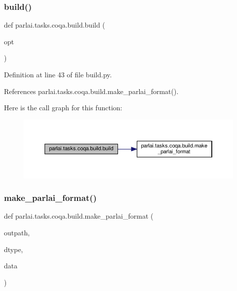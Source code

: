 \subsubsection{\texorpdfstring{build()}{build()}}
{\footnotesize\ttfamily def parlai.\+tasks.\+coqa.\+build.\+build (\begin{DoxyParamCaption}\item[{}]{opt }\end{DoxyParamCaption})}



Definition at line 43 of file build.\+py.



References parlai.\+tasks.\+coqa.\+build.\+make\+\_\+parlai\+\_\+format().

Here is the call graph for this function\+:
\nopagebreak
\begin{figure}[H]
\begin{center}
\leavevmode
\includegraphics[width=350pt]{namespaceparlai_1_1tasks_1_1coqa_1_1build_ae49969fbac6726d7510f9cefd4b8450a_cgraph}
\end{center}
\end{figure}
\mbox{\label{namespaceparlai_1_1tasks_1_1coqa_1_1build_ae2bc52f1ecab4681f1c2ebf013629aec}} 
\subsubsection{\texorpdfstring{make\+\_\+parlai\+\_\+format()}{make\_parlai\_format()}}
{\footnotesize\ttfamily def parlai.\+tasks.\+coqa.\+build.\+make\+\_\+parlai\+\_\+format (\begin{DoxyParamCaption}\item[{}]{outpath,  }\item[{}]{dtype,  }\item[{}]{data }\end{DoxyParamCaption})}



